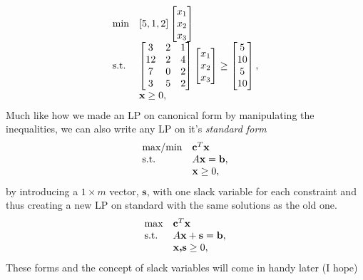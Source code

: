 \begin{align}
\begin{array}{ll@{}ll}
\text{min} &[5,1,2]\begin{bmatrix}x_{1} \\x_{2} \\x_{3}\end{bmatrix}&\\
\text{s.t.} &\begin{bmatrix}3&2&1 \\12&2&4 \\7&0&2\\3&5&2\end{bmatrix}\begin{bmatrix}x_{1} \\x_{2} \\x_{3}\end{bmatrix} \geq \begin{bmatrix}5 \\10 \\5\\10\end{bmatrix},&\\
&\textbf{x} \geq 0,&\\
\end{array}
\end{align}
Much like how we made an LP on canonical form by manipulating the inequalities, we can also write any LP on it's \textit{standard form} 
\begin{align}
\begin{array}{ll@{}ll}
\text{max/min} &\textbf{c}^T\textbf{x}&\\
\text{s.t.} &A\textbf{x} = \textbf{b},&\\
&\textbf{x} \geq 0,&\\
\end{array}
\end{align}
by introducing a $1\times m$ vector, $\textbf{s}$, with one slack variable for each constraint and thus creating a new LP on standard with the same solutions as the old one.
\begin{align}
\begin{array}{ll@{}ll}
\text{max} &\textbf{c}^T\textbf{x}&\\
\text{s.t.} &A\textbf{x}+\textbf{s} =\textbf{b},&\\
&\textbf{x,s} \geq 0,&\\
\end{array}
\end{align}
These forms and the concept of slack variables will come in handy later (I hope)
